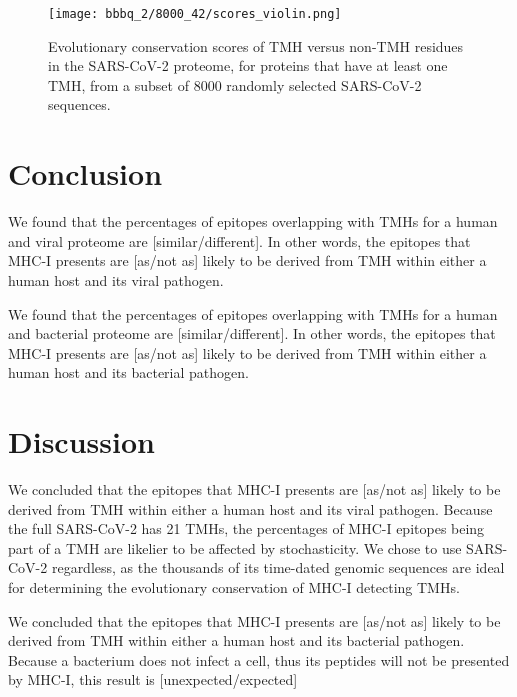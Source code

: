 \begin{figure}[!htbp]
  \texttt{[image: bbbq\_2/8000\_42/scores\_violin.png]}
  \caption{
    Evolutionary conservation scores of TMH versus non-TMH
    residues in the SARS-CoV-2 proteome,
    for proteins that have at least one TMH,
    from a subset of 8000 randomly selected SARS-CoV-2 sequences.
  }
  \label{fig:evolutionary_conservation_8k_violin}
\end{figure}

\section{Conclusion}

We found that the percentages of epitopes overlapping 
with TMHs for a human and viral proteome are 
[similar/different]. In other words, the
epitopes that MHC-I presents are [as/not as] likely 
to be derived from TMH within either a human host and its viral pathogen.

We found that the percentages of epitopes overlapping 
with TMHs for a human and bacterial proteome are 
[similar/different]. In other words, the
epitopes that MHC-I presents are [as/not as] likely 
to be derived from TMH within either a human host and its bacterial pathogen.

\section{Discussion}

We concluded that the
epitopes that MHC-I presents are [as/not as] likely 
to be derived from TMH within either a human host and its viral pathogen.
Because the full SARS-CoV-2 has 21 TMHs, the percentages
of MHC-I epitopes being part of a TMH are likelier to be affected by
stochasticity. We chose to use SARS-CoV-2 regardless, as the thousands
of its time-dated genomic sequences are ideal for determining the 
evolutionary conservation of MHC-I detecting TMHs. 

We concluded that the
epitopes that MHC-I presents are [as/not as] likely 
to be derived from TMH within either a human host and its bacterial pathogen.
Because a bacterium does not infect a cell, thus its peptides
will not be presented by MHC-I, this result is [unexpected/expected]

